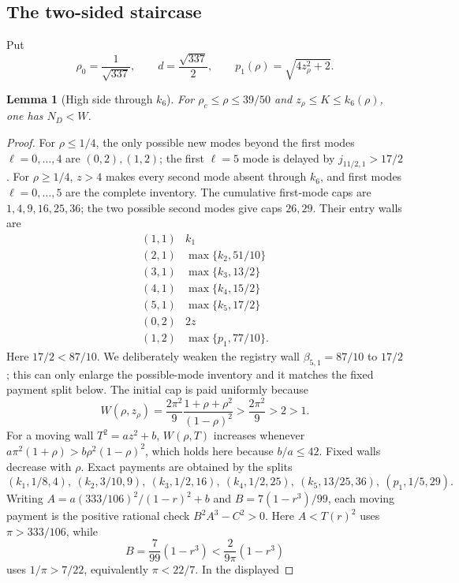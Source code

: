 \documentclass[11pt]{article}
\numberwithin{equation}{section}
\newtheorem{lemma}[theorem]{Lemma}
\theoremstyle{definition}
\theoremstyle{remark}
\begin{document}
\subsection{The two-sided staircase}

Put
\[
 \rho_0=\frac1{\sqrt{337}},\qquad d=\frac{\sqrt{337}}2,
 \qquad p_1(\rho)=\sqrt{4z_\rho^2+2}.
\]

\begin{lemma}[High side through \(k_6\)]
\label{cm:lem-k6}
For \(\rho_c\leq\rho\leq39/50\) and
\(z_\rho\leq K\leq k_6(\rho)\), one has \(N_D<W\).
\end{lemma}

\begin{proof}
For \(\rho\leq1/4\), the only possible new modes beyond the first modes
\(\ell=0,\ldots,4\) are \((0,2),(1,2)\); the first \(\ell=5\) mode is
delayed by \(j_{11/2,1}>17/2\).  For \(\rho\geq1/4\),
\(z>4\) makes every second mode absent through \(k_6\), and first modes
\(\ell=0,\ldots,5\) are the complete inventory.  The cumulative first-mode
caps are \(1,4,9,16,25,36\); the two possible second modes give caps
\(26,29\).  Their entry walls are
\[
\begin{array}{c|c}
(1,1)&k_1\\
(2,1)&\max\{k_2,51/10\}\\
(3,1)&\max\{k_3,13/2\}\\
(4,1)&\max\{k_4,15/2\}\\
(5,1)&\max\{k_5,17/2\}\\
(0,2)&2z\\
(1,2)&\max\{p_1,77/10\}.
\end{array}
\]
Here \(17/2<87/10\).  We deliberately weaken the registry wall
\(\beta_{5,1}=87/10\) to \(17/2\); this can only enlarge the possible-mode
inventory and it matches the fixed payment split below.
The initial cap is paid uniformly because
\[
 W(\rho,z_\rho)=\frac{2\pi^2}{9}
 \frac{1+\rho+\rho^2}{(1-\rho)^2}
 >\frac{2\pi^2}{9}>2>1.
\]
For a moving wall \(T^2=az^2+b\), \(W(\rho,T)\) increases whenever
\(a\pi^2(1+\rho)>b\rho^2(1-\rho)^2\), which holds here because
\(b/a\leq42\).  Fixed walls decrease with \(\rho\).  Exact payments are
obtained by the splits
\[
 (k_1,1/8,4),\ (k_2,3/10,9),\ (k_3,1/2,16),\
 (k_4,1/2,25),\ (k_5,13/25,36),\ (p_1,1/5,29).
\]
Writing
\(A=a(333/106)^2/(1-r)^2+b\) and
\(B=7(1-r^3)/99\), each moving payment is the positive rational check
\(B^2A^3-C^2>0\).  Here \(A<T(r)^2\) uses
\(\pi>333/106\), while
\[
 B=\frac7{99}(1-r^3)
 <\frac{2}{9\pi}(1-r^3)
\]
uses \(1/\pi>7/22\), equivalently \(\pi<22/7\).  In the displayed

\end{proof}
\end{document}
